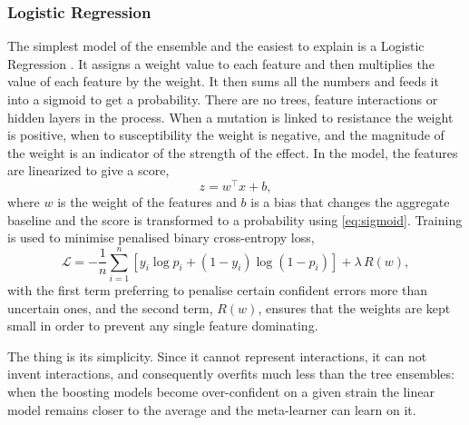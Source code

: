 \documentclass[journal]{IEEEtran}
\begin{document}
\subsubsection{Logistic Regression}
The simplest model of the ensemble and the easiest to explain is a Logistic
Regression \cite{hosmer2013alr}. It assigns a weight value to each feature and then
multiplies the value of each feature by the weight. It then sums all the numbers and
feeds it into a sigmoid to get a probability. There are no trees, feature
interactions or hidden layers in the process. When a mutation is linked to
resistance the weight is positive, when to susceptibility the weight is negative,
and the magnitude of the weight is an indicator of the strength of the effect. In
the model, the features are linearized to give a score,
\begin{equation}
z = w^\top x + b,
\label{eq:logreg_score}
\end{equation}
where $w$ is the weight of the features and $b$ is a bias that changes the aggregate
baseline and the score is transformed to a probability using
\eqref{eq:sigmoid}. Training is used to minimise penalised binary
cross-entropy loss,
\begin{equation}
\mathcal{L} = -\frac{1}{n}\sum_{i=1}^{n}\left[y_i \log p_i + (1-y_i)\log(1-p_i)\right] + \lambda\,R(w),
\label{eq:logreg_loss}
\end{equation}
with the first term preferring to penalise certain confident errors more than
uncertain ones, and the second term, $R(w)$, ensures that the weights are kept small
in order to prevent any single feature dominating.

The thing is its simplicity. Since it cannot represent interactions, it can not
invent interactions, and consequently overfits much less than the tree ensembles:
when the boosting models become over-confident on a given strain the linear model
remains closer to the average and the meta-learner can learn on it.
\end{document}

